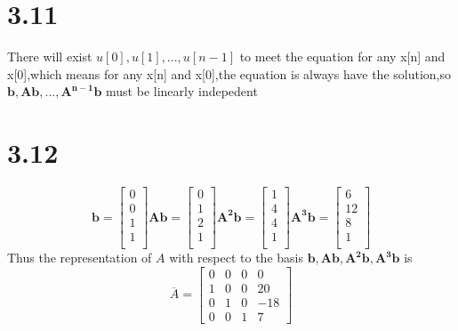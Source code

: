 \documentclass{article}
\begin{document}
\section*{3.11}
There will exist $u[0],u[1],...,u[n-1]$ to meet the equation
for any x[n] and x[0],which means for any x[n] and x[0],the equation
is always have the solution,so $\boldsymbol{b},\boldsymbol{Ab},...,\boldsymbol{A^{n-1}b}$ must be linearly indepedent


\section*{3.12}
\begin{equation*}
\boldsymbol{b}=
\left[
\begin{array}{c}
0\\
0\\
1\\
1\\
\end{array}
\right]
\boldsymbol{Ab}=
\left[
\begin{array}{c}
0\\
1\\
2\\
1\\
\end{array}
\right]
\boldsymbol{A^2b}=
\left[
\begin{array}{c}
1\\
4\\
4\\
1\\
\end{array}
\right]
\boldsymbol{A^3b}=
\left[
\begin{array}{c}
6\\
12\\
8\\
1\\
\end{array}
\right]
\end{equation*}
Thus the representation of $A$ with respect to the basis {$\boldsymbol{b},\boldsymbol{Ab},\boldsymbol{A^2b},\boldsymbol{A^3b}$} is 
\begin{equation*}       %
\overline{A}=
\left[                %
\begin{array}{cccc}   %
0& 0 &0 & 0\\  %
1 & 0 &0 &20\\
0 & 1& 0 &-18 \\  
0 & 0 & 1& 7
\end{array}
\right]
\end{equation*}
\end{document}
